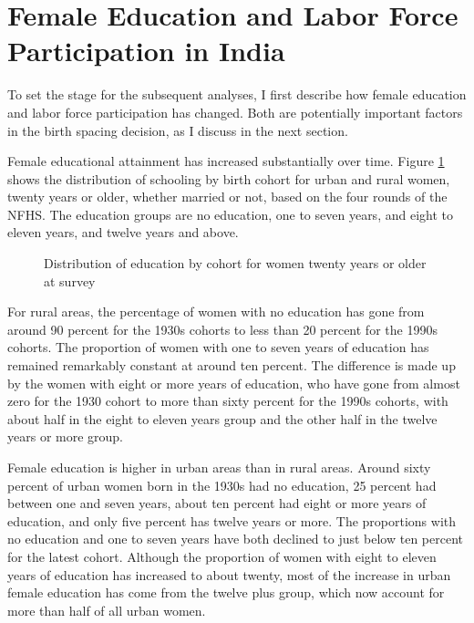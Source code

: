 \documentclass[12pt,letterpaper]{article}
\begin{document}
\section{Female Education and Labor Force Participation in India}

To set the stage for the subsequent analyses, I first describe how female education
and labor force participation has changed.
Both are potentially important factors in the birth spacing decision, as I discuss
in the next section.

Female educational attainment has increased substantially over time.
Figure \ref{fig:education_over_time} shows the distribution of schooling by birth 
cohort for urban and rural women, 
twenty years or older, whether married or not, based on the four rounds of the NFHS.
The education groups are no education, one to seven years, and eight to eleven years,
and twelve years and above.

\begin{figure}[htpb]
\centering
{} 
\caption{Distribution of education by cohort for women twenty years or older at survey}
\label{fig:education_over_time}
\end{figure}


For rural areas, the percentage of women with no education has gone from around 90 percent
for the 1930s cohorts to less than 20 percent for the 1990s cohorts. 
The proportion of women with one to seven years of education has remained remarkably
constant at around ten percent.
The difference is made up by the women with eight or more years of education, who have
gone from almost zero for the 1930 cohort to more than sixty percent for the 1990s cohorts,
with about half in the eight to eleven years group and 
the other half in the twelve years or more group.

Female education is higher in urban areas than in rural areas.
Around sixty percent of urban women born in the 1930s had no education, 25 percent had
between one and seven years, about ten percent had eight or more years of education, and 
only five percent has twelve years or more.
The proportions with no education and one to seven years have both declined to just below 
ten percent for the latest cohort.
Although the proportion of women with eight to eleven years of education has increased
to about twenty, most of the increase in urban female education has come from the 
twelve plus group, which now account for more than half of all urban women.
\end{document}
